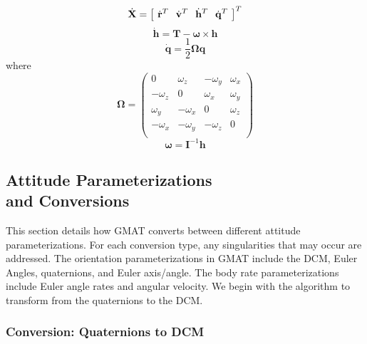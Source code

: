 \begin{equation}
   \dot{\mathbf{X}} = \left[ \hspace{.05 in} \dot{\mathbf{r}}^T \hspace{.1 in} \dot{\mathbf{v}}^T \hspace{.1 in}  \dot{\mathbf{h}}^T \hspace{.1 in}  \dot{\mathbf{q}}^T  \hspace{.05 in} \right]^T
\end{equation}
%
\begin{equation}
   \dot{\mathbf{h}} = \mathbf{T} - \mathbf{\boldsymbol\omega}\times\mathbf{h}
\end{equation}
%
\begin{equation}
   \dot{\mathbf{q}} = \frac{1}{2}\mathbf{\Omega}\mathbf{q}
\end{equation}
%
where
%
\begin{equation}
    \mathbf{\Omega} = \left(\begin{array}{ccccc}
     0 & \omega_z  & -\omega_y & \omega_x\\
     -\omega_z & 0 & \omega_x & \omega_y\\
     \omega_y & -\omega_x & 0 & \omega_z\\
     -\omega_x & -\omega_y & -\omega_z & 0\\
  \end{array}\right)
\end{equation}
%
\begin{equation}
    \mathbf{\boldsymbol\omega} = \mathbf{I}^{-1}\mathbf{h}
\end{equation}

\subsection{Attitude Parameterizations \\ and Conversions}
\label{Sec:AttitudeParameterizations}

This section details how GMAT converts between different attitude
parameterizations.  For each conversion type, any singularities that
may occur are addressed.  The orientation parameterizations in GMAT
include the DCM, Euler Angles, quaternions, and Euler axis/angle.
The body rate parameterizations include Euler angle rates and
angular velocity.  We begin with the algorithm to transform from the
quaternions to the DCM.

\subsubsection{Conversion:  Quaternions to DCM}\label{sec:AttQuattoR}

